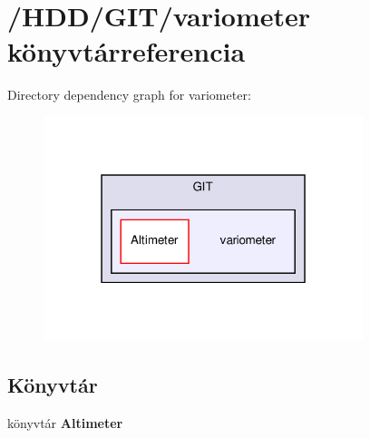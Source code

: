 \section{/\-H\-D\-D/\-G\-I\-T/variometer könyvtárreferencia}
\label{dir_5845edf9e912c9693b688a074bfdd119}
Directory dependency graph for variometer\-:
\nopagebreak
\begin{figure}[H]
\begin{center}
\leavevmode
\includegraphics[width=264pt]{dir_5845edf9e912c9693b688a074bfdd119_dep}
\end{center}
\end{figure}
\subsection*{Könyvtár}
\begin{DoxyCompactItemize}
\item 
könyvtár {\bf Altimeter}
\end{DoxyCompactItemize}
